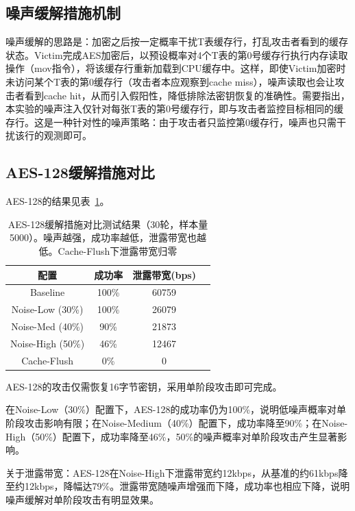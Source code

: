 \subsection{噪声缓解措施机制}

噪声缓解的思路是：加密之后按一定概率干扰T表缓存行，打乱攻击者看到的缓存状态。Victim完成AES加密后，以预设概率对4个T表的第0号缓存行执行内存读取操作（mov指令），将该缓存行重新加载到CPU缓存中。这样，即使Victim加密时未访问某个T表的第0缓存行（攻击者本应观察到cache miss），噪声读取也会让攻击者看到cache hit，从而引入假阳性，降低排除法密钥恢复的准确性。需要指出，本实验的噪声注入仅针对每张T表的第0号缓存行，即与攻击者监控目标相同的缓存行。这是一种针对性的噪声策略：由于攻击者只监控第0缓存行，噪声也只需干扰该行的观测即可。

\subsection{AES-128缓解措施对比}

AES-128的结果见表~\ref{tab:aes128_mitigation}。

\begin{table}[htbp]
    \centering
    \caption{AES-128缓解措施对比测试结果（30轮，样本量5000）。噪声越强，成功率越低，泄露带宽也越低。Cache-Flush下泄露带宽归零}
    \label{tab:aes128_mitigation}
    \begin{tabular}{cccc}
        \toprule
        配置 & 成功率 & 泄露带宽(bps) \\
        \midrule
        Baseline & 100\% & 60759 \\
        Noise-Low (30\%) & 100\% & 26079 \\
        Noise-Med (40\%) & 90\% & 21873 \\
        Noise-High (50\%) & 46\% & 12467 \\
        Cache-Flush & 0\% & 0 \\
        \bottomrule
    \end{tabular}
\end{table}

AES-128的攻击仅需恢复16字节密钥，采用单阶段攻击即可完成。

在Noise-Low（30\%）配置下，AES-128的成功率仍为100\%，说明低噪声概率对单阶段攻击影响有限；在Noise-Medium（40\%）配置下，成功率降至90\%；在Noise-High（50\%）配置下，成功率降至46\%，50\%的噪声概率对单阶段攻击产生显著影响。

关于泄露带宽：AES-128在Noise-High下泄露带宽约12kbps，从基准的约61kbps降至约12kbps，降幅达79\%。泄露带宽随噪声增强而下降，成功率也相应下降，说明噪声缓解对单阶段攻击有明显效果。

